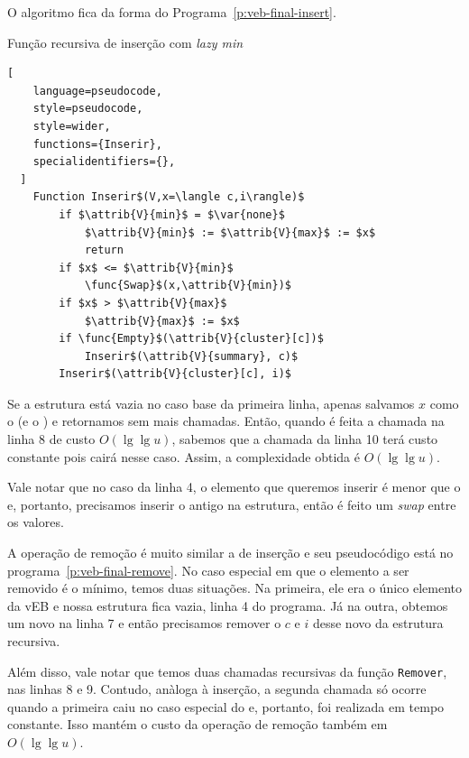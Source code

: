 O algoritmo fica da forma do Programa~\ref{p:veb-final-insert}.

\begin{programruledcaption}{Função recursiva de inserção com \emph{lazy min} \label{p:veb-final-insert}}
  \begin{lstlisting}[
    language=pseudocode,
    style=pseudocode,
    style=wider,
    functions={Inserir},
    specialidentifiers={},
  ]
    Function Inserir$(V,x=\langle c,i\rangle)$
        if $\attrib{V}{min}$ = $\var{none}$
            $\attrib{V}{min}$ := $\attrib{V}{max}$ := $x$
            return
        if $x$ <= $\attrib{V}{min}$
            \func{Swap}$(x,\attrib{V}{min})$
        if $x$ > $\attrib{V}{max}$
            $\attrib{V}{max}$ := $x$
        if \func{Empty}$(\attrib{V}{cluster}[c])$
            Inserir$(\attrib{V}{summary}, c)$
        Inserir$(\attrib{V}{cluster}[c], i)$
  \end{lstlisting}
\end{programruledcaption}

Se a estrutura está vazia no caso base da primeira linha, apenas salvamos $x$
como o  (e o ) e retornamos sem mais chamadas. Então, quando é
feita a chamada na linha 8 de custo $O(\lg \lg u)$, sabemos que a chamada da
linha 10 terá custo constante pois cairá nesse caso. Assim, a complexidade
obtida é $O(\lg \lg u)$.

Vale notar que no caso da linha 4, o elemento que queremos inserir é menor que o
 e, portanto, precisamos inserir o antigo  na estrutura, então
é feito um \textit{swap} entre os valores.  

A operação de remoção é muito similar a de inserção e seu pseudocódigo está no
programa~\ref{p:veb-final-remove}. No caso especial em que o elemento a ser
removido é o mínimo, temos duas situações. Na primeira, ele era o único elemento
da vEB e nossa estrutura fica vazia, linha 4 do programa. Já na outra, obtemos
um novo  na linha 7 e então precisamos remover o $c$ e $i$ desse novo
 da estrutura recursiva.

Além disso, vale notar que temos duas chamadas recursivas da função
\texttt{Remover}, nas linhas 8 e 9. Contudo, anàloga à inserção, a segunda
chamada só ocorre quando a primeira caiu no caso especial do  e,
portanto, foi realizada em tempo constante. Isso mantém o custo da operação de
remoção também em $O(\lg \lg u)$.

